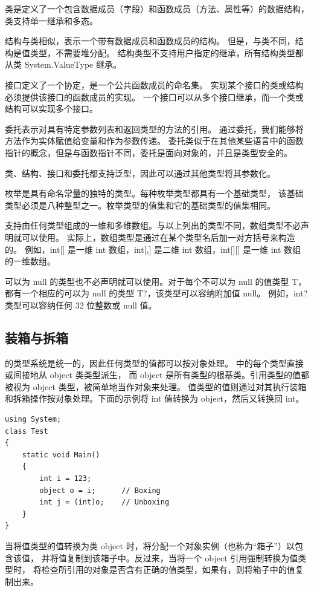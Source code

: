 类是定义了一个包含数据成员（字段）和函数成员（方法、属性等）的数据结构，类支持单一继承和多态。

结构与类相似，表示一个带有数据成员和函数成员的结构。
但是，与类不同，结构是值类型，不需要堆分配。
结构类型不支持用户指定的继承，所有结构类型都从类 System.ValueType 继承。

接口定义了一个协定，是一个公共函数成员的命名集。
实现某个接口的类或结构必须提供该接口的函数成员的实现。
一个接口可以从多个接口继承，而一个类或结构可以实现多个接口。

委托表示对具有特定参数列表和返回类型的方法的引用。
通过委托，我们能够将方法作为实体赋值给变量和作为参数传递。
委托类似于在其他某些语言中的函数指针的概念，但是与函数指针不同，委托是面向对象的，并且是类型安全的。

类、结构、接口和委托都支持泛型，因此可以通过其他类型将其参数化。

枚举是具有命名常量的独特的类型。每种枚举类型都具有一个基础类型，
该基础类型必须是八种整型之一。枚举类型的值集和它的基础类型的值集相同。

\cs  支持由任何类型组成的一维和多维数组。与以上列出的类型不同，数组类型不必声明就可以使用。
实际上，数组类型是通过在某个类型名后加一对方括号来构造的。
例如，int[] 是一维 int 数组，int[,] 是二维 int 数组，int[][] 是一维 int 数组的一维数组。

可以为 null 的类型也不必声明就可以使用。对于每个不可以为 null 的值类型 T，
都有一个相应的可以为 null 的类型 T?，该类型可以容纳附加值 null。
例如，int? 类型可以容纳任何 32 位整数或 null 值。

\subsection{装箱与拆箱}
\cs  的类型系统是统一的，因此任何类型的值都可以按对象处理。 \cs  中的每个类型直接或间接地从 object 类类型派生，
而 object 是所有类型的根基类。引用类型的值都被视为 object 类型，被简单地当作对象来处理。
值类型的值则通过对其执行装箱和拆箱操作按对象处理。下面的示例将 int 值转换为 object，然后又转换回 int。

\begin{lstlisting}
using System;
class Test
{
    static void Main()
    {
        int i = 123;
        object o = i;      // Boxing
        int j = (int)o;    // Unboxing
    }
}
\end{lstlisting}

当将值类型的值转换为类 object 时，将分配一个对象实例（也称为“箱子”）以包含该值，
并将值复制到该箱子中。反过来，当将一个 object 引用强制转换为值类型时，
将检查所引用的对象是否含有正确的值类型，如果有，则将箱子中的值复制出来。

